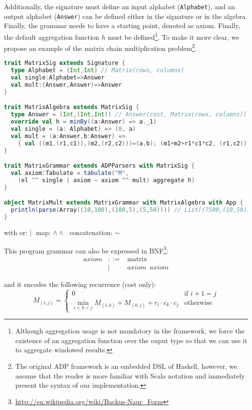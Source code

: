 Additionally, the signature must define an input alphabet ({\tt Alphabet}), and an output alphabet ({\tt Answer}) can be defined either in the signature or in the algebra. Finally, the grammar needs to have a starting point, denoted as axiom. Finally, the default aggregation function $h$ must be defined\footnote{Although aggregation usage is not mandatory in the framework, we force the existence of an aggregation function over the ouput type so that we can use it to aggregate windowed results.}. To make it more clear, we propose an example of the matrix chain multiplication problem\footnote{The original ADP framework is an embedded DSL of Haskell, however, we assume that the reader is more familiar with Scala notation and immediately present the syntax of our implementation.}.

\begin{lstlisting}[language=Scala,caption={Matrix chain mulitiplication DSL implementation}]
trait MatrixSig extends Signature {
  type Alphabet = (Int,Int) // Matrix(rows, columns)
  val single:Alphabet=>Answer
  val mult:(Answer,Answer)=>Answer
}

trait MatrixAlgebra extends MatrixSig {
  type Answer = (Int,(Int,Int)) // Answer(cost, Matrix(rows, columns))
  override val h = minBy((a:Answer) => a._1)
  val single = (a: Alphabet) => (0, a)
  val mult = (a:Answer,b:Answer) =>
    { val ((m1,(r1,c1)),(m2,(r2,c2)))=(a,b); (m1+m2+r1*c1*c2, (r1,c2)) }
}

trait MatrixGrammar extends ADPParsers with MatrixSig {
  val axiom:Tabulate = tabulate("M",
    (el ^^ single | axiom ~ axiom ^^ mult) aggregate h)
}

object MatrixMult extends MatrixGrammar with MatrixAlgebra with App {
  println(parse(Array((10,100),(100,5),(5,50)))) // List((7500,(10,50)))
}
\end{lstlisting}
\begin{center}\vspace{-18pt} with or: $|\,\,$ map: $\land\land\,\,$ concatenation: $\sim$ \end{center}

This program grammar can also be expressed in BNF\footnote{\url{http://en.wikipedia.org/wiki/Backus-Naur\_Form}}:
\[\begin{array}{lrl}
axiom &::=& \text{matrix} \\
 &|& axiom \,\,\, axiom
\end{array}\]

and it encodes the following recurrence (cost only):
	\[M_{(i,j)}=\left\{\begin{array}{ll}
		0 & \text{if } i+1= j\\
		\min_{i<k<j} M_{(i,k)}+M_{(k,j)}+r_i \cdot c_k \cdot c_j & \text{otherwise}
	\end{array}\right. \]

